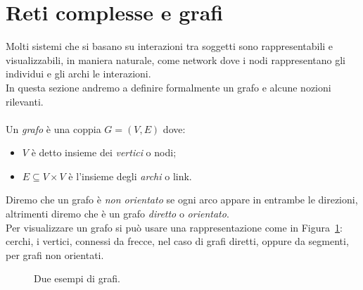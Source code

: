 \section{Reti complesse e grafi}
Molti sistemi che si basano su interazioni tra soggetti sono rappresentabili e visualizzabili, in maniera naturale, come network dove i nodi rappresentano gli individui e gli archi le interazioni.\\
In questa sezione andremo a definire formalmente un grafo e alcune nozioni rilevanti.\\ \\
Un \textit{grafo} \`e una coppia $G=(V,	E) $ dove:
\begin{itemize}
	\item $V$ \`e detto  insieme dei \textit{vertici} o nodi;
	\item $E\subseteq V \times V$ \`e l'insieme degli \textit{archi} o link.
\end{itemize}
Diremo che un grafo \`e \textit{non orientato} se ogni arco appare in entrambe le direzioni, altrimenti diremo che \`e un grafo \textit{diretto} o \textit{orientato}.\\
Per visualizzare un grafo si pu\`o usare una rappresentazione come in Figura~\ref{fig::esegrafi}: cerchi, i vertici, connessi da frecce, nel caso di grafi diretti, oppure da segmenti, per grafi non orientati. 
\begin{figure}[h]
\centering
{}  \hfill
{}
\caption{Due esempi di grafi.}
\label{fig::esegrafi}
\end{figure}


